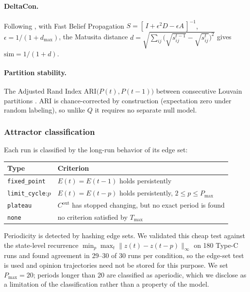 \paragraph{DeltaCon.}
Following \citet{koutra2013deltacon}, with Fast Belief Propagation
$S = [\,I + \epsilon^2 D - \epsilon A\,]^{-1}$, $\epsilon = 1/(1 + d_{\max})$, the
Matusita distance
$d = \sqrt{\sum_{ij}\bigl(\sqrt{s^{t-1}_{ij}} - \sqrt{s^{t}_{ij}}\bigr)^2}$ gives
$\mathrm{sim} = 1/(1+d)$.

\paragraph{Partition stability.}
The Adjusted Rand Index $\mathrm{ARI}\bigl(P(t), P(t{-}1)\bigr)$ between consecutive
Louvain partitions \citep{hubert1985comparing}. ARI is chance-corrected by construction
(expectation zero under random labeling), so unlike $Q$ it requires no separate null
model.

\subsubsection{Attractor classification}
\label{sec:conv-attractor}

Each run is classified by the long-run behavior of its edge set:

\begin{center}
\begin{tabular}{ll}
\toprule
Type & Criterion \\
\midrule
\texttt{fixed\_point}    & $E(t) = E(t{-}1)$ holds persistently \\
\texttt{limit\_cycle}:$p$ & $E(t) = E(t{-}p)$ holds persistently, $2 \le p \le P_{\max}$ \\
\texttt{plateau}         & $C^{\mathrm{out}}$ has stopped changing, but no exact period is found \\
\texttt{none}            & no criterion satisfied by $T_{\max}$ \\
\bottomrule
\end{tabular}
\end{center}

Periodicity is detected by hashing edge sets. We validated this cheap test against the
state-level recurrence $\min_p \max_t \lVert z(t) - z(t-p)\rVert_\infty$ on 180 Type-C
runs and found agreement in 29--30 of 30 runs per condition, so the edge-set test is used
and opinion trajectories need not be stored for this purpose. We set $P_{\max} = 20$;
periods longer than 20 are classified as aperiodic, which we disclose as a limitation of
the classification rather than a property of the model.

